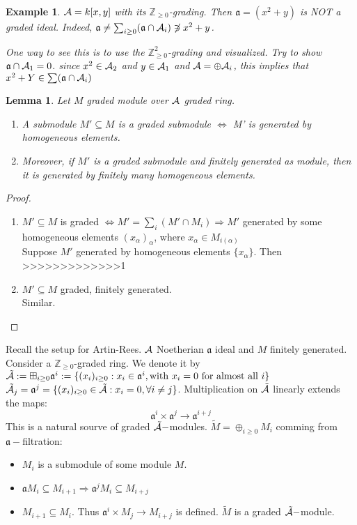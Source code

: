 \documentclass[11pt]{article}
\newtheorem{lemma}[thm]{Lemma}
\newtheorem{ex}[thm]{Example}
\newcommand{\intg}{\mathbb Z}
\newcommand{\sca}{{\mathfrak a}}
\newcommand{\cala}{{\cal A}}
\newcommand{\Lrta}{\Longrightarrow}
\newcommand{\lrta}{\longrightarrow}
\newcommand{\Llrta}{\Longleftrightarrow}
\begin{document}
\begin{ex}
$\cala=k[x,y]$ with its $\intg_{\geq 0}$-grading. Then $\sca=(x^2+y)$ is NOT a graded ideal. Indeed, $\sca\neq \sum_{i\geq 0}(\sca\cap \cala_i)\not\ni x^2+y$.

One way to see this is to use the $\intg^2_{\geq 0}$-grading and visualized. Try to show $\sca\cap \cala_1={0}$. since $x^2\in\cala_2$ and $y\in\cala_1$ and $\cala=\oplus\cala_i$, this implies that $x^2+Y\in \sum(\sca\cap\cala_i)$
\end{ex}

\begin{lemma}
Let $M$ graded module over $\cala$ graded ring. 
\begin{enumerate}[label=(\roman*)]
\item A submodule $M'\subseteq M$ is a graded submodule $\Llrta$ M' is generated by homogeneous elements. 
\item Moreover, if $M'$ is a graded submodule and finitely generated as module, then it is generated by finitely many homogeneous elements.
\end{enumerate}
\end{lemma}
\begin{proof}
\begin{enumerate}[label=(\roman*)]
\item $M'\subseteq M$ is graded $\Llrta M'=\sum_i(M'\cap M_i)\Lrta M'$ generated by some homogeneous elements $(x_\alpha)_\alpha$, where $x_\alpha\in M_{i(\alpha)}$\\
Suppose $M'$ generated by homogeneous elements $\{x_\alpha\}$. Then
>>>>>>>>>>>>>1
\item $M'\subseteq M$ graded, finitely generated.\\
Similar.
\end{enumerate}
\end{proof}

Recall the setup for Artin-Rees. $\cala$ Noetherian $\sca$ ideal and $M$ finitely generated. Consider a $\intg_{\geq 0}$-graded ring. We denote it by $\tilde{\cala}:=\boxplus_{i\geq 0}\sca^i:=\{(x_i)_{i\geq 0}:x_i\in \sca^i, \text{with }x_i=0 \text{ for almost all }i\}$ 
$\tilde{\cala}_j=\sca^j=\{(x_i)_{i\geq 0}\in \tilde{\cala}: x_i=0, \forall i\neq j\}$. Multiplication on $\tilde{\cala}$ linearly extends the maps:
$$
\sca^i\times \sca^j\lrta \sca^{i+j}
$$
This is a natural sourve of graded $\tilde{\cala}-$modules. $\tilde{M}=\oplus_{i\geq 0} M_i$ comming from $\sca-$filtration:
\begin{itemize}
\item $M_i$ is a submodule of some module $M$.
\item $\sca M_i\subseteq M_{i+1}\Lrta\sca^j M_i\subseteq M_{i+j}$
\item $M_{i+1}\subseteq M_i$. Thus $\sca^i\times M_j\lrta M_{i+j}$ is defined. $\tilde{M}$ is a graded $\tilde{\cala}-$module.
\end{itemize}
\end{document}
